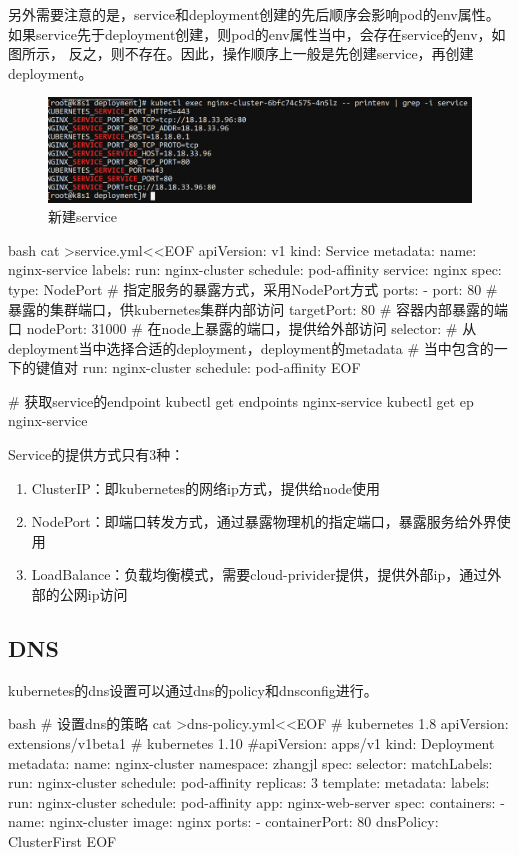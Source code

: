 另外需要注意的是，service和deployment创建的先后顺序会影响pod的env属性。
如果service先于deployment创建，则pod的env属性当中，会存在service的env，如图所示，
反之，则不存在。因此，操作顺序上一般是先创建service，再创建deployment。
\begin{figure}[H]
  \centering
  \includegraphics[width=\linewidth]{k8s_service.png}
  \caption{新建service}
  \label{fig:k8s_service}
\end{figure}

\begin{code-block}{bash}
cat >service.yml<<EOF
apiVersion: v1
kind: Service
metadata:
  name: nginx-service
  labels:
    run: nginx-cluster
    schedule: pod-affinity
    service: nginx
spec:
  type: NodePort # 指定服务的暴露方式，采用NodePort方式
  ports:
  - port: 80        # 暴露的集群端口，供kubernetes集群内部访问
    targetPort: 80  # 容器内部暴露的端口
    nodePort: 31000 # 在node上暴露的端口，提供给外部访问
  selector: # 从deployment当中选择合适的deployment，deployment的metadata
            # 当中包含的一下的键值对
    run: nginx-cluster
    schedule: pod-affinity
EOF

# 获取service的endpoint
kubectl get endpoints nginx-service
kubectl get ep nginx-service
\end{code-block}
Service的提供方式只有3种：
\begin{enumerate}
    \item ClusterIP：即kubernetes的网络ip方式，提供给node使用
    \item NodePort：即端口转发方式，通过暴露物理机的指定端口，暴露服务给外界使用
    \item LoadBalance：负载均衡模式，需要cloud-privider提供，提供外部ip，通过外部的公网ip访问
\end{enumerate}

\subsection{DNS}
kubernetes的dns设置可以通过dns的policy和dnsconfig进行。
\begin{code-block}{bash}
# 设置dns的策略
cat >dns-policy.yml<<EOF
# kubernetes 1.8
apiVersion: extensions/v1beta1
# kubernetes 1.10
#apiVersion: apps/v1
kind: Deployment
metadata:
  name: nginx-cluster
  namespace: zhangjl
spec:
  selector:
    matchLabels:
      run: nginx-cluster
      schedule: pod-affinity
  replicas: 3
  template:
    metadata:
      labels:
        run: nginx-cluster
        schedule: pod-affinity
        app: nginx-web-server
    spec:
      containers:
      - name: nginx-cluster
        image: nginx
        ports:
        - containerPort: 80
      dnsPolicy: ClusterFirst
EOF
\end{code-block}

